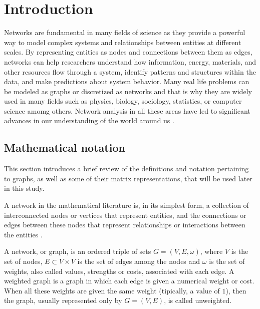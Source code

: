 
\chapter[Introduction]{Introduction}
\label{chap:intro}

Networks are fundamental in many fields of science as they provide a powerful way to model complex systems and relationships between entities at different scales. By representing entities as nodes and connections between them as edges, networks can help researchers understand how information, energy, materials, and other resources flow through a system, identify patterns and structures within the data, and make predictions about system behavior. Many real life problems can be modeled as graphs or discretized as networks and that is why they are widely used in many fields such as physics, biology, sociology, statistics, or computer science amomg others. Network analysis in all these areas have led to significant advances in our understanding of the world around us \cite{albert2002statistical, katz1953new, newman2018networks}.

\section{Mathematical notation}
\label{sec:graph}
This section introduces a brief review of the definitions and notation pertaining to graphs, as well as some of their matrix representations, that will be used later in this study.

A network in the mathematical literature is, in its simplest form, a collection of interconnected nodes or vertices that represent entities, and the connections or edges between these nodes that represent relationships or interactions between the entities \cite{arrigo2022dynamic}.

\begin{definition}
    A network, or graph, is an ordered triple of sets $G = (V, E, \omega)$, where $V$ is the set of nodes, $E\subset V\times V$ is the set of edges among the nodes and $\omega$ is the set of  weights, also called values, strengths or costs, associated with each edge. A weighted graph is a graph in which each edge is given a numerical weight or cost. When all these weights are given the same weight (tipically, a value of $1$), then the graph, usually represented only by $G = (V, E)$, is called unweighted.
\end{definition}

